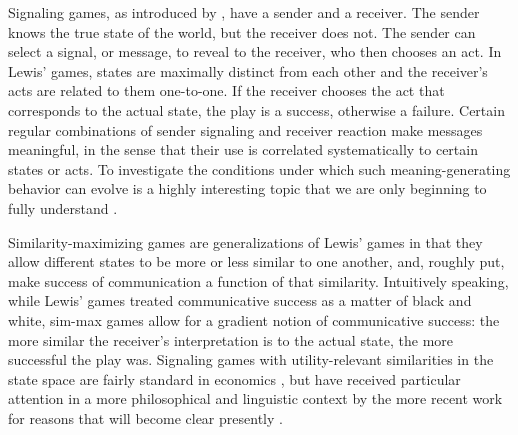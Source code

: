 Signaling games, as introduced by \citet{Lewis_1969:Convention}, have
a sender and a receiver. The sender knows the true state of the world,
but the receiver does not. The sender can select a signal, or message,
to reveal to the receiver, who then chooses an act. In Lewis' games,
states are maximally distinct from each other and the receiver's acts
are related to them one-to-one. If the receiver chooses the act that
corresponds to the actual state, the play is a success, otherwise a
failure. Certain regular combinations of sender signaling and receiver
reaction make messages meaningful, in the sense that their use is
correlated systematically to certain states or acts. To investigate
the conditions under which such meaning-generating behavior can evolve
is a highly interesting topic that we are only beginning to fully
understand
\citep[e.g.][]{Warneryd1993:Cheap-Talk-Coor,BlumeKim1993:Evolutionary-St,Zollman2005:Talking-to-Neig,Huttegger2007:Evolution-and-t,Pawlowitsch2008:Why-Evolution-d,Barrett2009:The-Evolution-o,Wagner2009:Communication-a,HutteggerSkyrms2010:Evolutionary-Dy,Skyrms2010:Signals,HutteggerZollman2011:Signaling-Games}.

Similarity-maximizing games are generalizations of Lewis' games in
that they allow different states to be more or less similar to one
another, and, roughly put, make success of communication a function of
that similarity. Intuitively speaking, while Lewis' games treated
communicative success as a matter of black and white, sim-max games
allow for a gradient notion of communicative success: the more similar
the receiver's interpretation is to the actual state, the more
successful the play was. Signaling games with utility-relevant
similarities in the state space are fairly standard in economics
\citep[e.g.][]{Spence1973:Job-market-sign,CrawfordSobel1982:Strategic-Infor},
but have received particular attention in a more philosophical and
linguistic context by the more recent work for reasons that will
become clear presently
\citep{Jager2007:The-Evolution-o,JagerRooijvan-Rooij2007:Language-Struct,JagerMetzger2011:Voronoi-Languag}.


